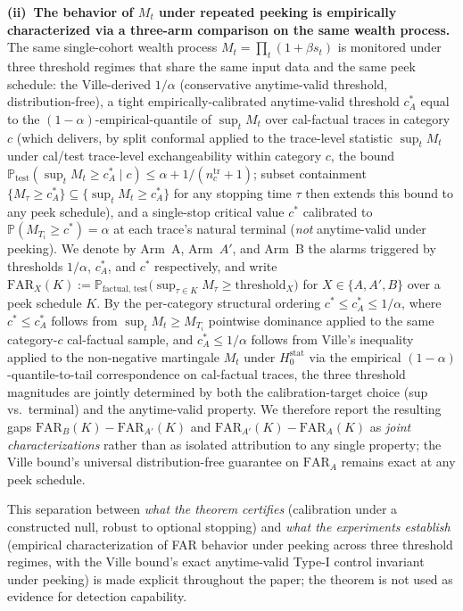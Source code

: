 \documentclass[runningheads]{llncs}
\newcommand{\Hnull}{H_0^{\text{stat}}}
\begin{document}
\begin{remark}
\textbf{(ii)~The behavior of $M_t$ under repeated peeking is
empirically characterized via a three-arm comparison on the same
wealth process.} The same single-cohort wealth process
$M_t = \prod_t(1 + \beta s_t)$ is monitored under three threshold
regimes that share the same input data and the same peek schedule:
the Ville-derived $1/\alpha$ (conservative anytime-valid threshold,
distribution-free), a tight empirically-calibrated anytime-valid
threshold $c_A^*$ equal to the $(1-\alpha)$-empirical-quantile of
$\sup_t M_t$ over cal-factual traces in category $c$ (which delivers,
by split conformal applied to the trace-level statistic $\sup_t M_t$
under cal/test trace-level exchangeability within category $c$, the
bound $\mathbb{P}_\text{test}(\sup_t M_t \ge c_A^* \mid c) \le \alpha
+ 1/(n_c^{\text{tr}}+1)$; subset containment $\{M_\tau \ge c_A^*\}
\subseteq \{\sup_t M_t \ge c_A^*\}$ for any stopping time $\tau$ then
extends this bound to any peek schedule), and a
single-stop critical value $c^*$ calibrated to
$\mathbb{P}(M_{T_i}\!\ge\!c^*)\!=\!\alpha$ at each trace's natural
terminal (\emph{not} anytime-valid under peeking). We denote by Arm~A,
Arm~$A'$, and Arm~B the alarms triggered by thresholds $1/\alpha$,
$c_A^*$, and $c^*$ respectively, and write
$\text{FAR}_X(K) := \mathbb{P}_{\text{factual, test}}\bigl(\sup_{\tau \in K} M_\tau \ge \text{threshold}_X\bigr)$
for $X \in \{A, A', B\}$ over a peek schedule $K$. By the per-category
structural ordering $c^* \leq c_A^* \leq 1/\alpha$, where
$c^* \leq c_A^*$ follows from $\sup_t M_t \geq M_{T_i}$ pointwise
dominance applied to the same category-$c$ cal-factual sample, and
$c_A^* \leq 1/\alpha$ follows from Ville's inequality applied to the
non-negative martingale $M_t$ under $\Hnull$ via the empirical
$(1-\alpha)$-quantile-to-tail correspondence on cal-factual traces, the
three threshold
magnitudes are jointly determined by both the calibration-target
choice (sup vs.\ terminal) and the anytime-valid property. We
therefore report the resulting gaps $\text{FAR}_B(K) -
\text{FAR}_{A'}(K)$ and $\text{FAR}_{A'}(K) - \text{FAR}_A(K)$ as
\emph{joint characterizations} rather than as isolated attribution to
any single property; the Ville bound's universal distribution-free
guarantee on $\text{FAR}_A$ remains exact at any peek schedule.

This separation between \emph{what the theorem certifies}
(calibration under a constructed null, robust to optional stopping)
and \emph{what the experiments establish} (empirical characterization
of FAR behavior under peeking across three threshold regimes, with
the Ville bound's exact anytime-valid Type-I control invariant under
peeking) is made explicit throughout the paper; the theorem is not
used as evidence for detection capability.
\end{remark}
\end{document}

